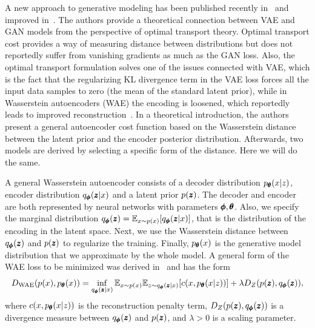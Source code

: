 A new approach to generative modeling has been published recently
in~\cite{mescheder2017adversarial} and improved in~\cite{tolstikhin2017wasserstein}.
The authors provide a theoretical connection between VAE and GAN models
from the perspective of optimal transport theory. Optimal transport
cost provides a way of measuring distance between distributions but
does not reportedly suffer from vanishing gradients as much as the
GAN loss. Also, the optimal transport formulation solves one of the
issues connected with VAE, which is the fact that the regularizing
KL divergence term in the VAE loss forces all the input data samples
to zero (the mean of the standard latent prior), while in Wasserstein
autoencoders (WAE) the encoding is loosened, which reportedly leads
to improved reconstruction~\cite{tolstikhin2017wasserstein}. In
a theoretical introduction, the authors present a general autoencoder
cost function based on the Wasserstein distance between the latent
prior and the encoder posterior distribution. Afterwards, two models
are derived by selecting a specific form of the distance. Here we
will do the same.

 

A general Wasserstein autoencoder consists of a decoder distribution
$p_{\pmb{{\theta}}}(x|z)$, encoder distribution $q_{\pmb{{\phi}}}(\pmb{{z}}|x)$ and a latent
prior $p(\pmb{{z}})$. The decoder and encoder are both represented by neural
networks with parameters $\pmb{{\phi}},\pmb{{\theta}}$. Also, we specify the marginal
distribution $q_{\vc{\phi}}(\vc{z})=\mathbb{E}_{x\sim p(x)}\left[q_{\vc{\phi}}(\vc{z}|x)\right]$,
that is the distribution of the encoding in the latent space. Next,
we use the Wasserstein distance between $q_{\pmb{{\phi}}}(\pmb{{z}})$ and $p(\pmb{{z}})$
to regularize the training. Finally, $p_{\pmb{{\theta}}}(x)$ is the generative
model distribution that we approximate by the whole model. A general
form of the WAE loss to be minimized was derived in~\cite{tolstikhin2017wasserstein}
and has the form
\begin{equation}
D_{\text{WAE}}(p(x),p_{\vc{\theta}}(x))=\inf_{q_{\vc{\phi}}(\vc{z}|x)}\mathbb{E}_{x\sim p(x)}\mathbb{E}_{z\sim q_{\vc{\phi}}(\vc{z}|x)}\left[c(x,p_{\vc{\theta}}(x|z))\right]+\lambda D_{Z}(p(\vc{z}),q_{\vc{\phi}}(\vc{z})),\label{eq:WAE_loss}
\end{equation}
where $c(x,p_{\pmb{{\theta}}}(x|z))$ is the reconstruction penalty term,
$D_{Z}(p(\pmb{{z}}),q_{\pmb{{\phi}}}(\pmb{{z}}))$ is a divergence measure between $q_{\pmb{{\phi}}}(\pmb{{z}})$
and $p(\pmb{{z}})$, and $\lambda>0$ is a scaling parameter. 

